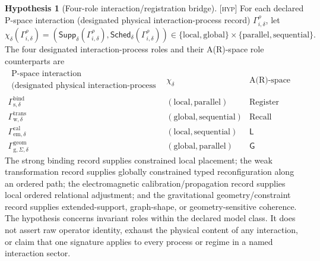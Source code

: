 \documentclass[11pt]{article}
\newcommand{\Register}{\ensuremath{\operatorname{Register}}}
\newcommand{\Recall}{\ensuremath{\operatorname{Recall}}}
\newcommand{\GOp}{\ensuremath{\mathsf{G}}}
\newcommand{\LOp}{\ensuremath{\mathsf{L}}}
\newcommand{\Sched}{\ensuremath{\mathsf{Sched}}}
\newcommand{\Supp}{\ensuremath{\mathsf{Supp}}}
\newcommand{\Hyp}{\textsc{[hyp]}}
\theoremstyle{definition}
\newtheorem{shypothesis}[sdefinition]{Hypothesis}
\begin{document}
\begin{shypothesis}[Four-role interaction/registration bridge]
\label{hyp:four-role-bridge}
\Hyp{} For each declared P-space interaction (designated physical
interaction-process record) $\Gamma_{i,\delta}^{\rho}$, let
\begin{equation}
\chi_\delta(\Gamma_{i,\delta}^{\rho})=
\left(\Supp_\delta(\Gamma_{i,\delta}^{\rho}),
\Sched_\delta(\Gamma_{i,\delta}^{\rho})\right)
\in\{\mathrm{local},\mathrm{global}\}\times
\{\mathrm{parallel},\mathrm{sequential}\}.
\label{eq:four-role-signature-supp}
\end{equation}
The four designated interaction-process roles and their A(R)-space role
counterparts are
\begin{equation}
\begin{array}{c|c|c}
\begin{gathered}\text{P-space interaction}\\
\text{(designated physical interaction-process record)}\end{gathered}&
\chi_\delta&\text{A(R)-space role}\\
\hline
\Gamma_{\mathrm{s},\delta}^{\mathrm{bind}}&
(\mathrm{local},\mathrm{parallel})&\Register\\
\Gamma_{\mathrm{w},\delta}^{\mathrm{trans}}&
(\mathrm{global},\mathrm{sequential})&\Recall\\
\Gamma_{\mathrm{em},\delta}^{\mathrm{cal}}&
(\mathrm{local},\mathrm{sequential})&\LOp\\
\Gamma_{\mathrm{g},\Sigma,\delta}^{\mathrm{geom}}&
(\mathrm{global},\mathrm{parallel})&\GOp
\end{array}
\label{eq:four-role-bridge-supp}
\end{equation}
The strong binding record supplies constrained local placement; the weak
transformation record supplies globally constrained typed reconfiguration along an
ordered path; the electromagnetic calibration/propagation record supplies local
ordered relational adjustment; and the gravitational geometry/constraint record
supplies extended-support, graph-shape, or geometry-sensitive coherence. The
hypothesis concerns invariant roles within the declared model class. It does not
assert raw operator identity, exhaust the physical content of any interaction, or
claim that one signature applies to every process or regime in a named interaction
sector.
\end{shypothesis}
\end{document}
